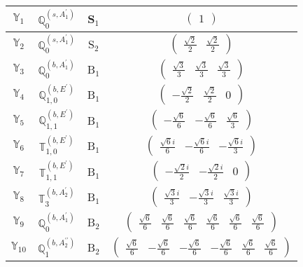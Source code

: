 \documentclass[fleqn,10pt,landscape]{article}
\begin{document}
\begin{itemize}
\begin{center}
\begin{longtable}{c|c|c|c}
$ \mathbb{Y}_{1} $ & $\mathbb{Q}_{0}^{(s,A_{1}^{\prime})}$ & S$_{1}$ & $\begin{pmatrix} 1 \end{pmatrix}$ \\ \hline
$ \mathbb{Y}_{2} $ & $\mathbb{Q}_{0}^{(s,A_{1}^{\prime})}$ & S$_{2}$ & $\begin{pmatrix} \frac{\sqrt{2}}{2} & \frac{\sqrt{2}}{2} \end{pmatrix}$ \\ \hline
$ \mathbb{Y}_{3} $ & $\mathbb{Q}_{0}^{(b,A_{1}^{\prime})}$ & B$_{1}$ & $\begin{pmatrix} \frac{\sqrt{3}}{3} & \frac{\sqrt{3}}{3} & \frac{\sqrt{3}}{3} \end{pmatrix}$ \\
$ \mathbb{Y}_{4} $ & $\mathbb{Q}_{1,0}^{(b,E^{\prime})}$ & B$_{1}$ & $\begin{pmatrix} - \frac{\sqrt{2}}{2} & \frac{\sqrt{2}}{2} & 0 \end{pmatrix}$ \\
$ \mathbb{Y}_{5} $ & $\mathbb{Q}_{1,1}^{(b,E^{\prime})}$ & B$_{1}$ & $\begin{pmatrix} - \frac{\sqrt{6}}{6} & - \frac{\sqrt{6}}{6} & \frac{\sqrt{6}}{3} \end{pmatrix}$ \\
$ \mathbb{Y}_{6} $ & $\mathbb{T}_{1,0}^{(b,E^{\prime})}$ & B$_{1}$ & $\begin{pmatrix} \frac{\sqrt{6} i}{6} & - \frac{\sqrt{6} i}{6} & - \frac{\sqrt{6} i}{3} \end{pmatrix}$ \\
$ \mathbb{Y}_{7} $ & $\mathbb{T}_{1,1}^{(b,E^{\prime})}$ & B$_{1}$ & $\begin{pmatrix} - \frac{\sqrt{2} i}{2} & - \frac{\sqrt{2} i}{2} & 0 \end{pmatrix}$ \\
$ \mathbb{Y}_{8} $ & $\mathbb{T}_{3}^{(b,A_{2}^{\prime})}$ & B$_{1}$ & $\begin{pmatrix} \frac{\sqrt{3} i}{3} & - \frac{\sqrt{3} i}{3} & \frac{\sqrt{3} i}{3} \end{pmatrix}$ \\ \hline
$ \mathbb{Y}_{9} $ & $\mathbb{Q}_{0}^{(b,A_{1}^{\prime})}$ & B$_{2}$ & $\begin{pmatrix} \frac{\sqrt{6}}{6} & \frac{\sqrt{6}}{6} & \frac{\sqrt{6}}{6} & \frac{\sqrt{6}}{6} & \frac{\sqrt{6}}{6} & \frac{\sqrt{6}}{6} \end{pmatrix}$ \\
$ \mathbb{Y}_{10} $ & $\mathbb{Q}_{1}^{(b,A_{2}^{\prime\prime})}$ & B$_{2}$ & $\begin{pmatrix} \frac{\sqrt{6}}{6} & - \frac{\sqrt{6}}{6} & - \frac{\sqrt{6}}{6} & - \frac{\sqrt{6}}{6} & \frac{\sqrt{6}}{6} & \frac{\sqrt{6}}{6} \end{pmatrix}$ \\

\end{longtable}
\end{center}
\end{itemize}
\end{document}
